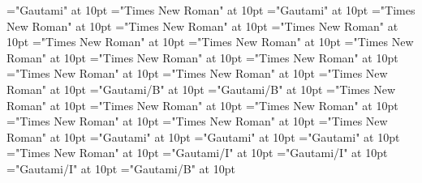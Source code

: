 \documentclass[a4paper]{article}
\begin{document}
 
\pagestyle{plain} 
\font\spantexitemtespanentranslationsexamplessensesensesentryletDatadicBody="Gautami" at 10pt
\font\xitemxitemtranslationbeforespanentranslationsexamplessensesensesentryletDatadicBody="Times New Roman" at 10pt
\font\xitemtespanentranslationsexamplessensesensesentryletDatadicBody="Gautami" at 10pt
\font\spanenspanenspanentranslationsexamplessensesensesentryletDatadicBody="Times New Roman" at 10pt
\font\spanenspanentranslationsexamplessensesensesentryletDatadicBody="Times New Roman" at 10pt
\font\translationaftertranslationsexamplessensesensesentryletDatadicBody="Times New Roman" at 10pt
\font\spanentranslationsexamplessensesensesentryletDatadicBody="Times New Roman" at 10pt
\font\spanenspanenpictureCaptionpictureRightentryletDatadicBody="Times New Roman" at 10pt
\font\spanenpictureCaptionpictureRightentryletDatadicBody="Times New Roman" at 10pt
\font\CmPicturepublishStemPileThumbnailPubafterpictureCaptionpictureRightentryletDatadicBody="Times New Roman" at 10pt
\font\CmPicturepublishStemPileThumbnailPubpictureCaptionpictureRightentryletDatadicBody="Times New Roman" at 10pt
\font\pictureCaptionpictureRightentryletDatadicBody="Times New Roman" at 10pt
\font\picturepictureRightentryletDatadicBody="Times New Roman" at 10pt
\font\pictureRightentryletDatadicBody="Times New Roman" at 10pt
\font\complexformformaftercomplexformrefsentryletDatadicBody="Gautami/B" at 10pt
\font\complexformformcomplexformrefsentryletDatadicBody="Gautami/B" at 10pt
\font\spanenspanencomplexformtypecomplexformrefsentryletDatadicBody="Times New Roman" at 10pt
\font\spanencomplexformtypecomplexformrefsentryletDatadicBody="Times New Roman" at 10pt
\font\complexformtypeaftercomplexformrefsentryletDatadicBody="Times New Roman" at 10pt
\font\complexformtypecomplexformrefsentryletDatadicBody="Times New Roman" at 10pt
\font\complexformrefsafterentryletDatadicBody="Times New Roman" at 10pt
\font\complexformrefsentryletDatadicBody="Times New Roman" at 10pt
\font\spantetranslationLdtranslationsexamplessensesensesentryletDatadicBody="Gautami" at 10pt
\font\translationLdaftertranslationsexamplessensesensesentryletDatadicBody="Gautami" at 10pt
\font\translationLdtranslationsexamplessensesensesentryletDatadicBody="Gautami" at 10pt
\font\translationsexamplessensesensesentryletDatadicBody="Times New Roman" at 10pt
\font\spanggoTeluINexampleexamplessensesensesentryletDatadicBody="Gautami/I" at 10pt
\font\exampleafterexamplessensesensesentryletDatadicBody="Gautami/I" at 10pt
\font\exampleexamplessensesensesentryletDatadicBody="Gautami/I" at 10pt
\font\LexEntrypublishStemComponentTargetHeadWordRefaentryrefcomponentprimaryrefsentryletDatadicBody="Gautami/B" at 10pt
\end{document}
